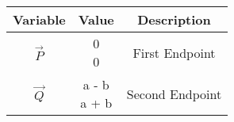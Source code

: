 \begin{tabular}[12pt]{ |c| c| c|}
    \hline
    \textbf{Variable} & \textbf{Value} & \textbf{Description}\\ 
    \hline
    $\vec{P}$ & \myvec{0 \\ 0} & First Endpoint\\
    \hline 
    $\vec{Q}$ & \myvec{a - b \\ a + b} & Second Endpoint\\
    \hline
    
    \end{tabular} \\
